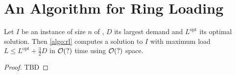 \section{An Algorithm for Ring Loading}



\begin{theorem}
	\label{theo:ring-loading-algorithm}
	Let $I$ be an instance of size $n$ of \RL, $D$ its largest demand and $L^\mathrm{opt}$ its optimal solution.
	Then \cref{algo:rl} computes a solution to $I$ with maximum load $L \leq L^\mathrm{opt} + \frac{3}{2} D$ in $\mathcal{O}(?)$ time using $\mathcal{O}(?)$ space.
\end{theorem}
\begin{proof}
	TBD
\end{proof}

